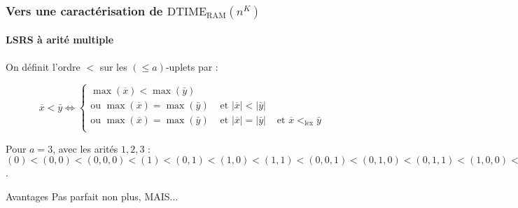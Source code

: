 \documentclass[10pt]{beamer}
\newcommand{\dtimeram}{\text{DTIME}_{\text{RAM}}\left( n^K \right)}
\newcommand{\leqa}{\left( \leqslant a \right)}
\begin{document}
	\begin{frame}
		\frametitle{Vers une caractérisation de $\dtimeram$}
		\framesubtitle{LSRS à arité multiple}
		
		\begin{defn}
			\label{def:bon_ordre_sur_uplets}
			On définit l'ordre $<$ sur les $\leqa$-uplets par :
			
			\[
			\overline{x} < \bar{y} \Leftrightarrow \left\lbrace
			\begin{array}{ccc}
			\max\left(\overline{x}\right) < \max\left(\bar{y}\right) & & \\
			\text{ou } \max\left(\overline{x}\right) = \max\left(\bar{y}\right) & 
			\text{ et } \left|\overline{x}\right| < \left|\bar{y}\right| & \\
			\text{ou } \max\left(\overline{x}\right) = \max\left(\bar{y}\right) & 
			\text{ et } \left|\overline{x}\right| = \left|\bar{y}\right| & 
			\text{ et } \overline{x} <_{\text{lex}} \bar{y}\\
			\end{array}
			\right. 
			\]
			
		\end{defn}
		
		\pause
		
		\begin{exemple}
			Pour $a = 3$, avec les arités $1,2,3$ : $(0) < (0, 0) < (0,0,0) < (1) < (0,1) < (1,0) < (1,1) < (0,0,1) < (0,1,0) < (0,1,1) < (1,0,0) < (1,0,1) < (1,1,0) < (1,1,1) < (2) < (0,2) < \dots$.
		\end{exemple}
		
		\pause 
		
		\begin{block}{Avantages}
			Pas parfait non plus, MAIS...
		\end{block}
	\end{frame}
	
\end{document}

